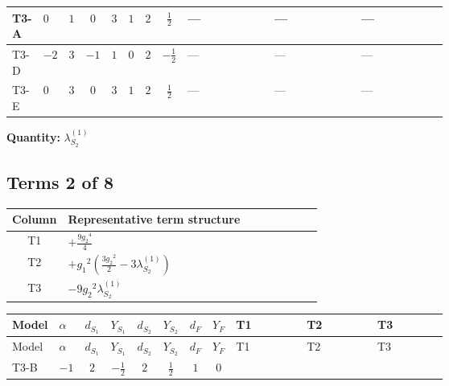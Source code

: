 \documentclass[8pt]{article}
\begin{document}
\begin{landscape}
\begin{longtable}{@{}llcccccc >{\raggedright\arraybackslash}p{0.21\linewidth} >{\raggedright\arraybackslash}p{0.21\linewidth} >{\raggedright\arraybackslash}p{0.21\linewidth}@{}}
\midrule
T3-A & $0$ & $1$ & $0$ & $3$ & $1$ & $2$ & $\frac{1}{2}$ & --- & --- & --- \\
\midrule
T3-D & $-2$ & $3$ & $-1$ & $1$ & $0$ & $2$ & $-\frac{1}{2}$ & --- & --- & --- \\
\midrule
T3-E & $0$ & $3$ & $0$ & $3$ & $1$ & $2$ & $\frac{1}{2}$ & --- & --- & --- \\
\midrule
\bottomrule
\end{longtable}
\clearpage
\noindent\textbf{Quantity: }$\lambda_{S_2}^{(1)}$\par\smallskip
\subsection*{Terms 2 of 8}
\begin{center}
\begin{tabular}{@{}c >{\raggedright\arraybackslash}p{0.82\linewidth}@{}}
\toprule
Column & Representative term structure \\
\midrule
T1 & \(\displaystyle +\frac{9 {g_2}^4}{4}\) \\
\midrule
T2 & \(\displaystyle +{g_1}^2 \left(\frac{3 {g_2}^2}{2}-3 {\lambda_{S_2}^{(1)}}\right)\) \\
\midrule
T3 & \(\displaystyle -9 {g_2}^2 {\lambda_{S_2}^{(1)}}\) \\
\midrule
\bottomrule
\end{tabular}
\end{center}
\smallskip
\tiny
\begin{longtable}{@{}llcccccc >{\raggedright\arraybackslash}p{0.21\linewidth} >{\raggedright\arraybackslash}p{0.21\linewidth} >{\raggedright\arraybackslash}p{0.21\linewidth}@{}}
\toprule
Model & $\alpha$ & $d_{S_1}$ & $Y_{S_1}$ & $d_{S_2}$ & $Y_{S_2}$ & $d_F$ & $Y_F$ & T1 & T2 & T3 \\
\midrule
\endfirsthead
\toprule
Model & $\alpha$ & $d_{S_1}$ & $Y_{S_1}$ & $d_{S_2}$ & $Y_{S_2}$ & $d_F$ & $Y_F$ & T1 & T2 & T3 \\
\midrule
\endhead
T3-B & $-1$ & $2$ & $-\frac{1}{2}$ & $2$ & $\frac{1}{2}$ & $1$ & $0$ & \scriptsize\adjustbox{max width=\linewidth}{$\begin{gathered} +\frac{9 {g_2}^4}{4}\end{gathered}$} & \scriptsize\adjustbox{max width=\linewidth}{$\begin{gathered} +{g_1}^2 \left(\frac{3 {g_2}^2}{2}-3 {\lambda_{S_2}^{(1)}}\right)\end{gathered}$} & \scriptsize\adjustbox{max width=\linewidth}{$\begin{gathered} -9 {g_2}^2 {\lambda_{S_2}^{(1)}}\end{gathered}$} \\

\end{longtable}
\end{landscape}
\end{document}
